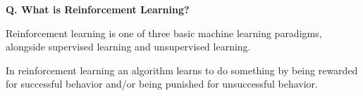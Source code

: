 
\begin{frame}[fragile]{\textbf{Q. What is Reinforcement Learning?}}
  \begin{wideitemize}
    \item Reinforcement learning is one of three basic machine learning paradigms, alongside
    supervised learning and unsupervised learning.
    \item In reinforcement learning an algorithm learns to do something by being
    rewarded for successful behavior and/or being punished for unsuccessful behavior.
  \end{wideitemize}
\end{frame}


